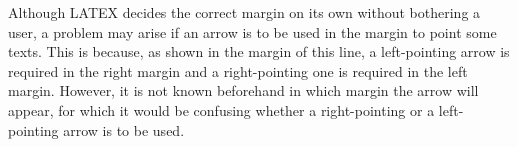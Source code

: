 \documentclass[]{article}
\begin{document}
Although LATEX decides the correct margin on its own without bothering a user, a problem may arise if an arrow is to be used in the margin to
point some texts.  This is because, as shown in the margin of this line, a left-pointing arrow is required in the right margin and a right-pointing 
one is required in the left margin. \marginpar[$\longrightarrow$]{$\longleftarrow$} However, it is not known beforehand in which margin the arrow will appear,
for which it would be confusing whether a right-pointing or a left-pointing arrow is to be used.
\end{document}
